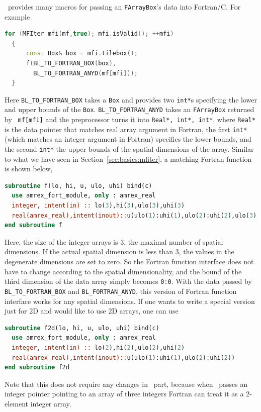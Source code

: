 {{\amrex\ provides many macros for passing an {\tt FArrayBox}'s data
into Fortran/C.  For example
\begin{lstlisting}[language=cpp]
  for (MFIter mfi(mf,true); mfi.isValid(); ++mfi)
  {
      const Box& box = mfi.tilebox();
      f(BL_TO_FORTRAN_BOX(box),
        BL_TO_FORTRAN_ANYD(mf[mfi]));
  }
\end{lstlisting}
Here {\tt BL\_TO\_FORTRAN\_BOX} takes a {\tt Box} and provides two
{\tt int*}s specifying the lower and upper bounds of the {\tt Box}.
{\tt BL\_TO\_FORTRAN\_ANYD} takes an {\tt FArrayBox} returned by {\tt
  mf[mfi]} and the preprocessor turns it into {\tt Real*, int*, int*},
where {\tt Real*} is the data pointer that matches real array argument
in Fortran, the first {\tt int*} (which matches an integer argument in
Fortran) specifies the lower bounds, and the second {\tt int*} the
upper bounds of the spatial dimensions of the array.  Similar to what
we have seen in Section~\ref{sec:basics:mfiter}, a matching Fortran
function is shown below,
\begin{lstlisting}[language=fortran]
subroutine f(lo, hi, u, ulo, uhi) bind(c)
  use amrex_fort_module, only : amrex_real
  integer, intent(in) :: lo(3),hi(3),ulo(3),uhi(3)
  real(amrex_real),intent(inout)::u(ulo(1):uhi(1),ulo(2):uhi(2),ulo(3):uhi(3))
end subroutine f
\end{lstlisting}
Here, the size of the integer arrays is 3, the maximal number of
spatial dimensions.  If the actual spatial dimension is less than 3,
the values in the degenerate dimensions are set to zero.  So the
Fortran function interface does not have to change according to the
spatial dimensionality, and the bound of the third dimension of the
data array simply becomes {\tt 0:0}.  With the data passed by {\tt
  BL\_TO\_FORTRAN\_BOX} and {\tt BL\_FORTRAN\_ANYD}, this version of
Fortran function interface works for any spatial dimensions.  If one
wants to write a special version just for 2D and would like to use 2D
arrays, one can use
\begin{lstlisting}[language=fortran]
subroutine f2d(lo, hi, u, ulo, uhi) bind(c)
  use amrex_fort_module, only : amrex_real
  integer, intent(in) :: lo(2),hi(2),ulo(2),uhi(2)
  real(amrex_real),intent(inout)::u(ulo(1):uhi(1),ulo(2):uhi(2))
end subroutine f2d
\end{lstlisting}
Note that this does not require any changes in \cpp\ part, because
when \cpp\ passes an integer pointer pointing to an array of three
integers Fortran can treat it as a 2-element integer array.

}}
